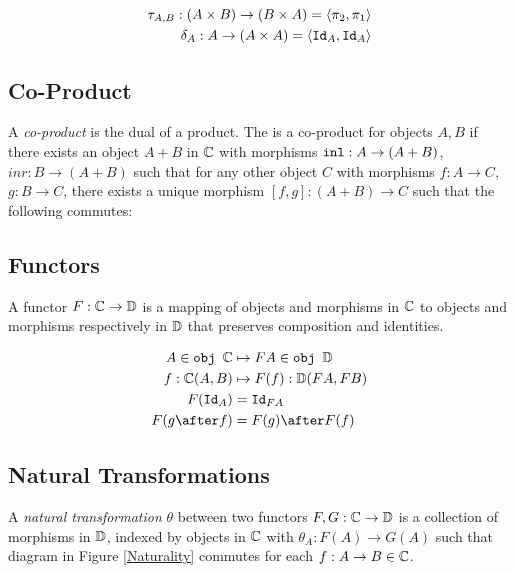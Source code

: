 \documentclass{Report}
\begin{document}
\begin{align*}
    \tau_{A, B}: (A\times B) \rightarrow (B\times A) = \langle\pi_2, \pi_1\rangle\\
    \delta_{A}: A \rightarrow (A\times A)  = \langle\texttt{Id}_{A}, \texttt{Id}_{A}\rangle
\end{align*}

\subsection{Co-Product}
A \textit{co-product} is the dual of a product. The is a co-product for objects $A, B$ if there exists an object $A+B$ in $\mathbb{C}$ with morphisms $\texttt{inl}: A\rightarrow (A+B)$, $inr: B\rightarrow (A+B)$ such that for any other object $C$ with morphisms $f: A\rightarrow C$, $g: B\rightarrow C$, there exists a unique morphism $[f, g]: (A + B)\rightarrow C $ such that the following commutes:


{\centering
{}
}


\subsection{Functors}
A functor $F: \mathbb{C} \rightarrow \mathbb{D}$ is a mapping of objects and morphisms in $\mathbb{C}$ to objects and morphisms respectively in $\mathbb{D}$ that preserves composition and identities.

\begin{align*}
    A\in\obj\C &\mapsto FA \in \obj\DC\\
    f: \C(A, B) &\mapsto F(f): \DC(FA, FB)\\
    F(\Id{A}) & = \Id{FA} \\
    F(g\after f) & = F(g)\after F(f)
\end{align*}

\subsection{Natural Transformations}

A \textit{natural transformation} $\theta$ between two functors $F, G: \mathbb{C} \rightarrow \mathbb{D}$ is a collection of morphisms in $\mathbb{D}$, indexed by objects in $\mathbb{C}$ with  $\theta_A: F(A) \rightarrow G(A)$ such that diagram in Figure \ref{Naturality} commutes for each $f: A \rightarrow B \in \mathbb{C}$.
\end{document}
